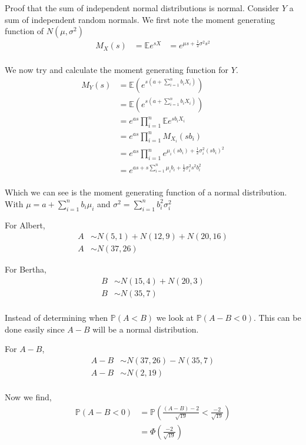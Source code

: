 \documentclass{article}
\newcommand{\prob}{\mathbb{P}}
\newcommand{\expect}{\mathbb{E}}
\begin{document}
Proof that the sum of independent normal distributions is normal.
Consider $Y$ a sum of independent random normals.
We first note the moment generating function of $N(\mu,\sigma^2)$
\begin{align*}
    M_X(s) &= \expect e^{sX}
    &= e^{\mu s + \frac{1}{2} \sigma^2 s^2} \\
\end{align*}

We now try and calculate the moment generating function for $Y$.
\begin{align*}
    M_Y(s) &= \expect \left(e^{s\left(a + \sum_{i=1}^n b_i X_i\right)}\right) \\
    &= \expect \left(e^{s\left(a + \sum_{i=1}^n b_i X_i\right)}\right) \\
    &= e^{as} \prod_{i=1}^n \expect e^{s b_i X_i} \\
    &= e^{as} \prod_{i=1}^n M_{X_i} (s b_i) \\
    &= e^{as} \prod_{i=1}^n e^{\mu_i (s b_i) + \frac{1}{2} \sigma_i^2 (s b_i)^2} \\
    &= e^{as + s \sum_{i=1}^n \mu_i b_i + \frac{1}{2} \sigma_i^2 s^2 b_i^2} \\
\end{align*}

Which we can see is the moment generating function of a normal distribution.
With $\mu = a + \sum_{i=1}^n b_i \mu_i$
and $\sigma^2 = \sum_{i=1}^n b_i^2 \sigma_i^2$

For Albert,
\begin{align*}
    A &\sim N(5,1) + N(12,9) + N(20,16) \\
    A &\sim N(37, 26)
\end{align*}

For Bertha,
\begin{align*}
    B &\sim N(15, 4) + N(20, 3) \\
    B &\sim N(35, 7) \\
\end{align*}

Instead of determining when $\prob (A < B)$ we look at $\prob (A - B < 0)$.
This can be done easily since $A - B$ will be a normal distribution.

For $A - B$,
\begin{align*}
    A - B &\sim N(37, 26) - N(35, 7) \\
    A - B &\sim N(2, 19) \\
\end{align*}

Now we find,
\begin{align*}
    \prob(A-B<0) &= \prob\left(\frac{(A-B)-2}{\sqrt{19}}<\frac{-2}{\sqrt{19}}\right) \\
    &= \Phi\left(\frac{-2}{\sqrt{19}}\right)
\end{align*}
\end{document}
